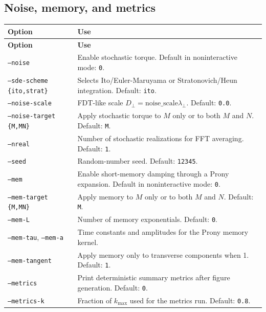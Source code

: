\documentclass[11pt]{article}
\begin{document}
\subsection{Noise, memory, and metrics}
\begin{longtable}{L{0.28\textwidth}L{0.64\textwidth}}
\toprule
\textbf{Option} & \textbf{Use} \\
\midrule
\endfirsthead
\toprule
\textbf{Option} & \textbf{Use} \\
\midrule
\endhead
\texttt{--noise} & Enable stochastic torque. Default in noninteractive mode: \texttt{0}. \\
\texttt{--sde-scheme \{ito,strat\}} & Selects Ito/Euler-Maruyama or Stratonovich/Heun integration. Default: \texttt{ito}. \\
\texttt{--noise-scale} & FDT-like scale \(D_\perp=\mathrm{noise\_scale}\lambda_\perp\). Default: \texttt{0.0}. \\
\texttt{--noise-target \{M,MN\}} & Apply stochastic torque to \(M\) only or to both \(M\) and \(N\). Default: \texttt{M}. \\
\texttt{--nreal} & Number of stochastic realizations for FFT averaging. Default: \texttt{1}. \\
\texttt{--seed} & Random-number seed. Default: \texttt{12345}. \\
\texttt{--mem} & Enable short-memory damping through a Prony expansion. Default in noninteractive mode: \texttt{0}. \\
\texttt{--mem-target \{M,MN\}} & Apply memory to \(M\) only or to both \(M\) and \(N\). Default: \texttt{M}. \\
\texttt{--mem-L} & Number of memory exponentials. Default: \texttt{0}. \\
\texttt{--mem-tau}, \texttt{--mem-a} & Time constants and amplitudes for the Prony memory kernel. \\
\texttt{--mem-tangent} & Apply memory only to transverse components when 1. Default: \texttt{1}. \\
\texttt{--metrics} & Print deterministic summary metrics after figure generation. Default: \texttt{0}. \\
\texttt{--metrics-k} & Fraction of \(k_{\max}\) used for the metrics run. Default: \texttt{0.8}. \\
\bottomrule
\end{longtable}
\end{document}
